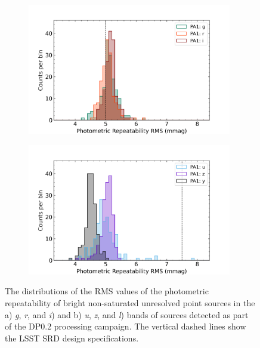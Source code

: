 \begin{figure}[!htp]
\begin{subfigure}{.5\textwidth}
    \includegraphics[width=0.98\textwidth]{figures/dp02_pa1_alltracts_gri}
\end{subfigure}%
\begin{subfigure}{.5\textwidth}
    \includegraphics[width=0.98\textwidth]{figures/dp02_pa1_alltracts_uzy}
\end{subfigure}
\par\medskip %
\caption[short]{The distributions of the RMS values of the photometric repeatability of bright non-saturated unresolved point sources  in the a) \emph{g}, \emph{r}, and \emph{i})  and  b) \emph{u}, \emph{z}, and \emph{l}) bands of sources detected as part of the DP0.2 processing campaign.  
The vertical dashed lines show the LSST SRD design specifications. }
\label{fig:faro_dp02_distr_pa1}
\end{figure}


